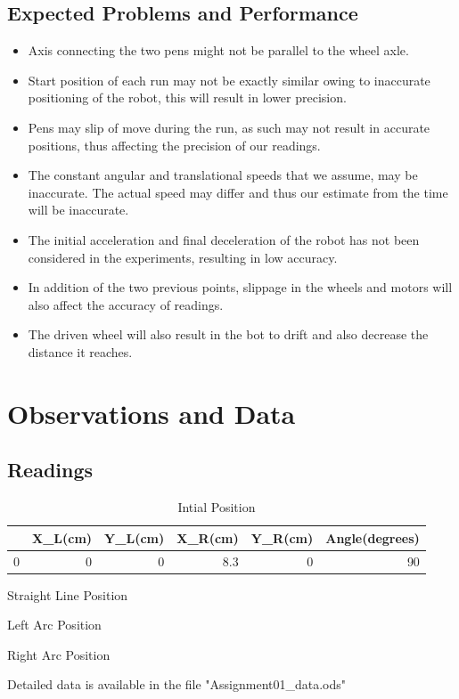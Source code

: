 \documentclass[10pt,a4paper]{article}
\begin{document}
	\subsection{Expected Problems and Performance}
		\begin{itemize}
			\item Axis connecting the two pens might not be parallel to the wheel axle.
			\item Start position of each run may not be exactly similar owing to inaccurate positioning of the robot, this will result in lower precision.
			\item Pens may slip of move during the run, as such may not result in accurate positions, thus affecting the precision of our readings.
			\item The constant angular and translational speeds that we assume, may be inaccurate. The actual speed may differ and thus our estimate from the time will be inaccurate.
			\item The initial acceleration and final deceleration of the robot has not been considered in the experiments, resulting in low accuracy.
			\item In addition of the two previous points, slippage in the wheels and motors will also affect the accuracy of readings.
			\item The driven wheel will also result in the bot to drift and also decrease the distance it reaches.
		\end{itemize}
	\section{Observations and Data}
		\subsection{Readings}
		\begin{table}[H]
			\centering
			\begin{tabular}{lrrrrr}
				\toprule
				{} &  X\_L(cm) &  Y\_L(cm) &  X\_R(cm) &  Y\_R(cm) &  Angle(degrees) \\
				\midrule
				0 &        0 &        0 &      8.3 &        0 &              90 \\
				\bottomrule
			\end{tabular}
			\caption{Intial Position}
		\end{table}
		\begin{table}[H]
			\centering
			
			\caption{Straight Line Position}
		\end{table}
		\begin{table}[H]
			\centering
			
			\caption{Left Arc Position}
		\end{table}
		\begin{table}[H]
			\centering
			
			\caption{Right Arc Position}
		\end{table}
		Detailed data is available in the file "Assignment01\_data.ods"
\end{document}
